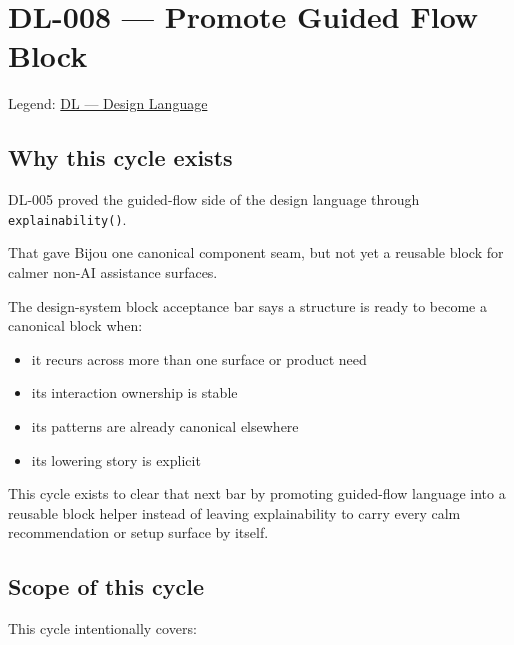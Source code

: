 \chapter{DL-008 --- Promote Guided Flow Block}\label{record-175}

\smallskip

Legend: \href{https://github.com/flyingrobots/bijou/blob/1853ad902f6bf219326409e7f743a5a1d6517dbc/docs/legends/DL-design-language.md}{DL --- Design Language}

\section{Why this cycle exists}\label{record-175-why-this-cycle-exists}

DL-005 proved the guided-flow side of the design language through \texttt{e\allowbreak{}x\allowbreak{}p\allowbreak{}l\allowbreak{}a\allowbreak{}i\allowbreak{}n\allowbreak{}a\allowbreak{}b\allowbreak{}i\allowbreak{}l\allowbreak{}i\allowbreak{}t\allowbreak{}y\allowbreak{}(\allowbreak{})}.

That gave Bijou one canonical component seam, but not yet a reusable block for calmer non-AI assistance surfaces.

The design-system block acceptance bar says a structure is ready to become a canonical block when:

\begin{itemize}
\tightlist
\item
  it recurs across more than one surface or product need
\item
  its interaction ownership is stable
\item
  its patterns are already canonical elsewhere
\item
  its lowering story is explicit
\end{itemize}

This cycle exists to clear that next bar by promoting guided-flow language into a reusable block helper instead of leaving explainability to carry every calm recommendation or setup surface by itself.

\section{Scope of this cycle}\label{record-175-scope-of-this-cycle}

This cycle intentionally covers:

